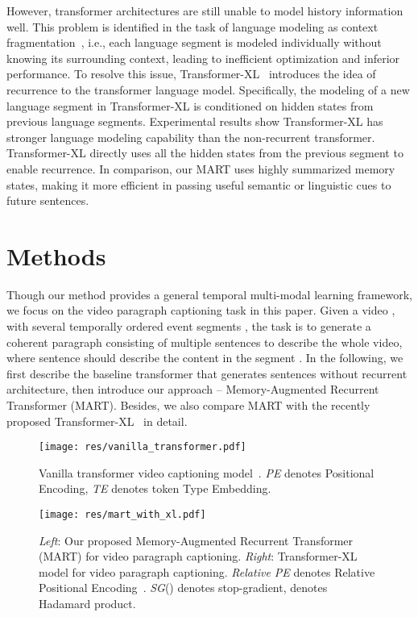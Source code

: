\documentclass[11pt,a4paper]{article}
\begin{document}
However, transformer architectures are still unable to model history information well.  
This problem is identified in the task of language modeling as context fragmentation~\cite{dai2019transformer}, i.e., each language segment is modeled individually without knowing its surrounding context, leading to inefficient optimization and inferior performance.
To resolve this issue, Transformer-XL~\cite{dai2019transformer} introduces the idea of recurrence to the transformer language model.
Specifically, the modeling of a new language segment in Transformer-XL is conditioned on hidden states from previous language segments. 
Experimental results show Transformer-XL has stronger language modeling capability than the non-recurrent transformer.
Transformer-XL directly uses all the hidden states from the previous segment to enable recurrence. 
In comparison, our MART uses highly summarized memory states, making it more efficient in passing useful semantic or linguistic cues to future sentences. 
 \section{Methods}\label{sec:methods}
Though our method provides a general temporal multi-modal learning framework, we focus on the video paragraph captioning task in this paper. 
Given a video , with several temporally ordered event segments , the task is to generate a coherent paragraph consisting of multiple sentences  to describe the whole video, where sentence  should describe the content in the segment . 
In the following, we first describe the baseline transformer that generates sentences without recurrent architecture, then introduce our approach -- Memory-Augmented Recurrent Transformer (MART). 
Besides, we also compare MART with the recently proposed Transformer-XL~\cite{dai2019transformer} in detail.

\begin{figure}[t]
  \centering
  \texttt{[image: res/vanilla\_transformer.pdf]}
  \caption{Vanilla transformer video captioning model~\cite{zhou2018end}. \textit{PE} denotes Positional Encoding, \textit{TE} denotes token Type Embedding.
  }
  \label{fig:vanilla_transformer}
\end{figure} 


\begin{figure*}[!ht]
  \centering
  \texttt{[image: res/mart\_with\_xl.pdf]}
  \caption{\textit{Left}: Our proposed Memory-Augmented Recurrent Transformer (MART) for video paragraph captioning. \textit{Right}: Transformer-XL~\cite{dai2019transformer} model for video paragraph captioning. \textit{Relative PE} denotes Relative Positional Encoding~\cite{dai2019transformer}.
  \textit{SG}() denotes stop-gradient,  denotes Hadamard product. 
  }
  \label{fig:recurrent_transformers}
\end{figure*}
\end{document}
